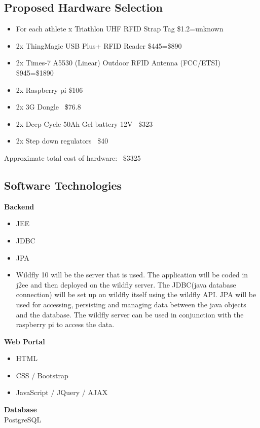 \documentclass{article}
\begin{document}
\subsection{Proposed Hardware Selection}
 \begin{itemize} 
 	\item For each athlete x Triathlon UHF RFID Strap Tag \quad \$1.2=unknown
 	\item 2x ThingMagic USB Plus+ RFID Reader \quad \$445=\$890
 	\item 2x Times-7 A5530 (Linear) Outdoor RFID Antenna (FCC/ETSI) \quad \$945=\$1890
 	\item 2x Raspberry pi \quad \$106
	\item 2x 3G Dongle ~\$76.8
	\item 2x Deep Cycle 50Ah Gel battery 12V ~\$323
	\item 2x Step down regulators ~\$40
 \end{itemize}
 
 Approximate total cost of hardware: \quad  ~\$3325

\subsection{Software Technologies}
\textbf{Backend}
\begin{itemize}
	\item JEE
	\item JDBC
	\item JPA
	\item Wildfly 10 will be the server that is used. The application will be coded in j2ee and then deployed on the wildfly server. The JDBC(java database connection) will be set up on wildfly itself using the wildfly API. JPA will be used for accessing, persisting and managing data between the java objects and the database. The wildfly server can be used in conjunction with  the raspberry pi to access the data. 
\end{itemize}
\textbf{Web Portal} 
\begin{itemize}
	\item HTML
	\item CSS / Bootstrap
	\item JavaScript / JQuery / AJAX
\end{itemize}
\textbf{Database} \\
PostgreSQL
\end{document}
